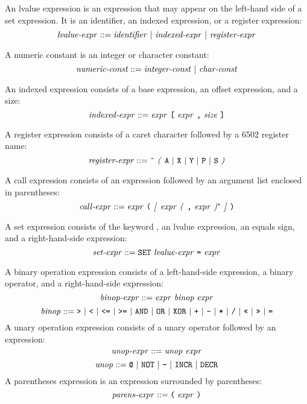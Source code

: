 \documentclass[10pt]{article}
\begin{document}
  An lvalue expression is an expression
that may appear on the left-hand side of a set expression.  It is an
identifier, an indexed expression, or a register expression:
%
$$\mbox{\textit{lvalue-expr}} ::= \mbox{\ensuremath{\mbox{\textit{identifier}}} $|$
  \ensuremath{\mbox{\textit{indexed-expr}}} $|$ \ensuremath{\mbox{\textit{register-expr}}}}$$

  A numeric constant is an integer or
character constant:
%
$$\mbox{\textit{numeric-const}} ::= \mbox{\ensuremath{\mbox{\textit{integer-const}}} $|$
  \ensuremath{\mbox{\textit{char-const}}}}$$
%

 An indexed expression consists of a
base expression, an offset expression, and a size:
%
$$\mbox{\textit{indexed-expr}} ::= \mbox{\ensuremath{\mbox{\textit{expr}}} \texttt{[}
    \ensuremath{\mbox{\textit{expr}}} \texttt{,} \ensuremath{\mbox{\textit{size}}} \texttt{]}}$$
%

 A register expression consists of a
caret character followed by a 6502 register name:
%
$$\mbox{\textit{register-expr}} ::= \mbox{\texttt{\^} \textit{(} \texttt{A} $|$
    \texttt{X} $|$ \texttt{Y} $|$ \texttt{P} $|$ \texttt{S} \textit{)}}$$
%

 A call expression consists of an expression
followed by an argument list enclosed in parentheses:
%
$$\mbox{\textit{call-expr}} ::= \mbox{\ensuremath{\mbox{\textit{expr}}} \texttt{(}
  \textit{[} \ensuremath{\mbox{\textit{expr}}} \textit{(} \texttt{,} \ensuremath{\mbox{\textit{expr}}} \textit{)}$^*$ \textit{]} \texttt{)}}$$
%


 A set expression consists of the keyword
, an lvalue expression, an equals sign, and a right-hand-side
expression:
%
$$\mbox{\textit{set-expr}} ::= \mbox{\texttt{SET} \ensuremath{\mbox{\textit{lvalue-expr}}} \texttt{=}
  \ensuremath{\mbox{\textit{expr}}}}$$
%

 A binary operation expression
consists of a left-hand-side expression, a binary operator, and a
right-hand-side expression:
%
$$\mbox{\textit{binop-expr}} ::= \mbox{\ensuremath{\mbox{\textit{expr}}} \ensuremath{\mbox{\textit{binop}}} \ensuremath{\mbox{\textit{expr}}}}$$
%
$$\mbox{\textit{binop}} ::= \mbox{\texttt{>} $|$ \texttt{<} $|$ \texttt{<=} $|$
  \texttt{>=} $|$ \texttt{AND} $|$ \texttt{OR} $|$ \texttt{XOR} $|$ \texttt{+} $|$
  \texttt{-} $|$ \texttt{*} $|$ \texttt{/} $|$ \texttt{<<} $|$ \texttt{>>} $|$
  \texttt{=}}$$
%
 A unary operation expression
consists of a unary operator followed by an expression:
%
$$\mbox{\textit{unop-expr}} ::= \mbox{\ensuremath{\mbox{\textit{unop}}} \ensuremath{\mbox{\textit{expr}}}}$$
%
$$\mbox{\textit{unop}} ::= \mbox{\texttt{@} $|$ \texttt{NOT} $|$ \texttt{-} $|$
  \texttt{INCR} $|$ \texttt{DECR}}$$
%
 A parentheses expression is an
expression surrounded by parentheses:
%
$$\mbox{\textit{parens-expr}} ::= \mbox{\texttt{(} \ensuremath{\mbox{\textit{expr}}} \texttt{)}}$$
%
\end{document}
